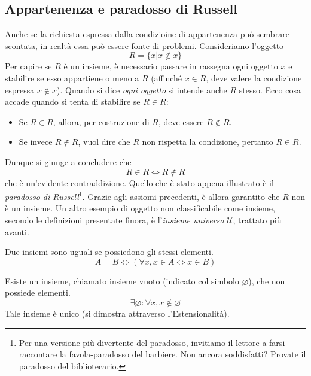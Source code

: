\subsection*{Appartenenza e paradosso di Russell}
Anche se la richiesta espressa dalla condizioine di appartenenza può sembrare
scontata, in realtà essa può essere fonte di problemi. Consideriamo l'oggetto
\[ R = \{x|x\not\in x\} \]
Per capire se $R$ è un insieme, è necessario passare in rassegna ogni oggetto
$x$ e stabilire se esso appartiene o meno a $R$ (affinché $x\in R$, deve valere
la condizione espressa $x\not\in x$). Quando si dice \textit{ogni oggetto} si
intende anche $R$ stesso. Ecco cosa accade quando si tenta di stabilire se
$R\in R$:
\begin{itemize}
\item Se $R\in R$, allora, per costruzione di $R$, deve essere $R\not\in R$.
\item Se invece $R\not\in R$, vuol dire che $R$ non rispetta la condizione, pertanto $R\in R$.
\end{itemize}
Dunque si giunge a concludere che \[ R\in R \Longleftrightarrow R\not\in R \]
che è un'evidente contraddizione. Quello che è stato appena illustrato è il \textit{paradosso
di Russell}\footnote{Per una versione più divertente del paradosso, invitiamo il
lettore a farsi raccontare la favola-paradosso del barbiere. Non ancora soddisfatti? Provate il paradosso del bibliotecario.}. Grazie agli assiomi precedenti, è allora garantito che $R$ non è
un insieme. Un altro esempio di oggetto non classificabile come insieme,
secondo le definizioni presentate finora, è l'\textit{insieme universo} $\mathcal{U}$,
trattato più avanti.

\vspace*{10pt}
\begin{tcolorbox}[colback=yellow!30, colframe=yellow!30!black, title={Assioma di Estensionalità}]
Due insiemi sono uguali se possiedono gli stessi elementi.
\[ A = B \Longleftrightarrow (\forall x,x\in A \Leftrightarrow x \in B) \]
\end{tcolorbox}

\begin{tcolorbox}[colback=yellow!30, colframe=yellow!30!black, title=Esistenza dell'insieme vuoto]
Esiste un insieme, chiamato insieme vuoto (indicato col simbolo $\varnothing$), che non possiede elementi.
\[\exists \varnothing:\forall x, x\not\in\varnothing\]
Tale insieme è unico (si dimostra attraverso l'Estensionalità).
\end{tcolorbox}


